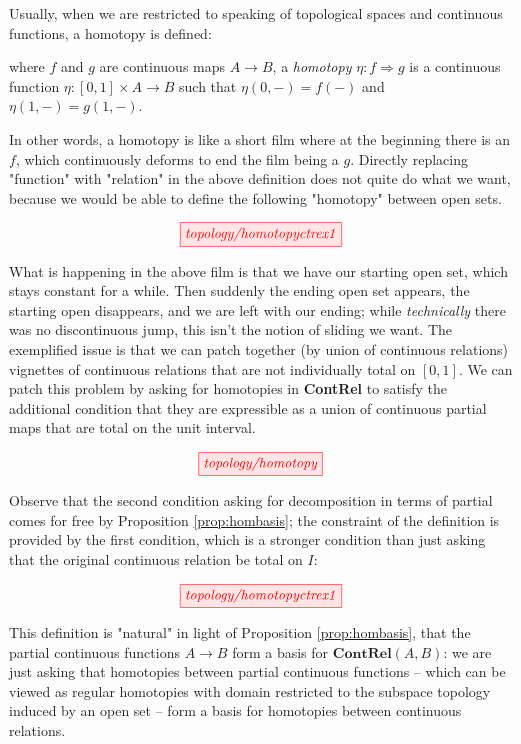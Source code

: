 
Usually, when we are restricted to speaking of topological spaces and continuous functions, a homotopy is defined:

\begin{defn}
where $f$ and $g$ are continuous maps $A \rightarrow B$, a \emph{homotopy} $\eta : f \Rightarrow g$ is a continuous function $\eta : [0,1] \times A \rightarrow B$ such that $\eta(0,-) = f(-)$ and $\eta(1,-) = g(1,-)$.
\end{defn}

In other words, a homotopy is like a short film where at the beginning there is an $f$, which continuously deforms to end the film being a $g$. Directly replacing "function" with "relation" in the above definition does not quite do what we want, because we would be able to define the following "homotopy" between open sets.

\[\tikzfig{topology/homotopyctrex1}\]

What is happening in the above film is that we have our starting open set, which stays constant for a while. Then suddenly the ending open set appears, the starting open disappears, and we are left with our ending; while \emph{technically} there was no discontinuous jump, this isn't the notion of sliding we want. The exemplified issue is that we can patch together (by union of continuous relations) vignettes of continuous relations that are not individually total on $[0,1]$. We can patch this problem by asking for homotopies in \textbf{ContRel} to satisfy the additional condition that they are expressible as a union of continuous partial maps that are total on the unit interval.

\[\tikzfig{topology/homotopy}\]

Observe that the second condition asking for decomposition in terms of partial comes for free by Proposition \ref{prop:hombasis}; the constraint of the definition is provided by the first condition, which is a stronger condition than just asking that the original continuous relation be total on $I$:

\[\tikzfig{topology/homotopyctrex1}\]

This definition is "natural" in light of Proposition \ref{prop:hombasis}, that the partial continuous functions $A \rightarrow B$ form a basis for $\mathbf{ContRel}(A,B)$: we are just asking that homotopies between partial continuous functions -- which can be viewed as regular homotopies with domain restricted to the subspace topology induced by an open set -- form a basis for homotopies between continuous relations.

